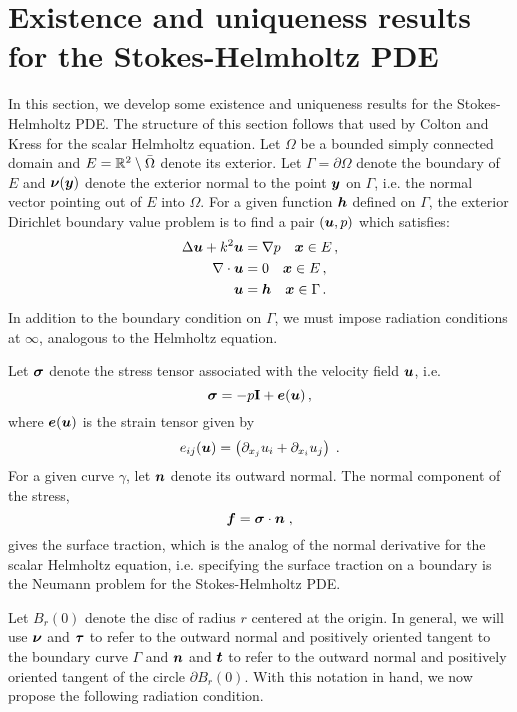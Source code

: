 \section{Existence and uniqueness results for the Stokes-Helmholtz PDE}

In this section, we develop some existence and uniqueness
results for the Stokes-Helmholtz PDE.
%
The structure of this section follows that used
by Colton and Kress \cite[Ch. 3]{colton1983integral}
for the scalar Helmholtz equation.
%
Let $\Omega$ be a bounded simply connected
domain and $E = \mathbb{R}^{2} \setminus \bar{\Omega}$ denote its
exterior.
%
Let $\Gamma = \partial \Omega$ denote the boundary of $E$ and
${\boldsymbol \nu}({\boldsymbol y})$ denote the exterior normal to the point ${\boldsymbol y}$ on
$\Gamma$, i.e. the normal vector pointing out of $E$ into $\Omega$.
%
For a given function ${\boldsymbol h}$ defined on $\Gamma$,
the exterior Dirichlet boundary value problem is to
find a pair $({\boldsymbol u},p)$ which satisfies:
\begin{align}
\Delta {\boldsymbol u} + k^{2} {\boldsymbol u} &= \nabla p \quad {\boldsymbol x} \in E \, ,\label{eq:helmstokes_ext}\\
\nabla \cdot {\boldsymbol u} &= 0 \quad {\boldsymbol x} \in E \, , \\
{\boldsymbol u} &= {\boldsymbol h} \quad {\boldsymbol x} \in \Gamma \, .
\end{align}
In addition to the boundary condition on
$\Gamma$, we must impose radiation conditions
at $\infty$, analogous to the Helmholtz equation.
%

Let ${\boldsymbol \sigma}$ denote the stress tensor associated with the velocity
field ${\boldsymbol u}$, i.e.
\begin{equation}
{\boldsymbol \sigma} = -p {\bf I} + {\boldsymbol e}({\boldsymbol u}) \, ,
\end{equation}
where ${\boldsymbol e}({\boldsymbol u})$ is the strain tensor given by
\begin{equation}
e_{ij}({\boldsymbol u}) = \left( \partial_{x_j} u_i + \partial_{x_i} u_j \right) \; .
\end{equation}
%
For a given curve $\gamma$, let ${\boldsymbol n}$ denote its outward
normal.
%
The normal component of the stress,
\begin{equation}
{\boldsymbol f} = {\boldsymbol \sigma} \cdot {\boldsymbol n} \; ,
\end{equation}
gives the surface traction, which is the analog of
the normal derivative for the scalar Helmholtz equation,
i.e. specifying the surface traction on a boundary is
the Neumann problem for the Stokes-Helmholtz PDE.

%
Let $B_r(0)$ denote the disc of radius $r$ centered
at the origin.
%
In general, we will use ${\boldsymbol \nu}$ and ${\boldsymbol \tau}$ to refer
to the outward normal and positively oriented
tangent to the boundary curve $\Gamma$ and ${\boldsymbol n}$ and
${\boldsymbol t}$ to refer to the outward normal and positively
oriented tangent of the circle $\partial B_r(0)$.
%
With this notation in hand, we now propose the following
radiation condition.

